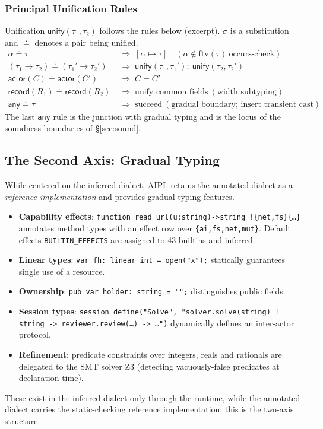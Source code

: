 \documentclass[11pt,a4paper]{article}
\newcommand{\code}[1]{\texttt{\small #1}}
\begin{document}
\subsubsection{Principal Unification Rules}
Unification $\mathsf{unify}(\tau_1,\tau_2)$ follows the rules below
(excerpt). $\sigma$ is a substitution and $\doteq$ denotes a pair being
unified.
\begin{align*}
\alpha \doteq \tau &\;\Rightarrow\; [\alpha \mapsto \tau]\quad
  (\alpha \notin \mathrm{ftv}(\tau)\ \text{occurs-check}) \\
(\tau_1 \to \tau_2) \doteq (\tau_1' \to \tau_2') &\;\Rightarrow\;
  \mathsf{unify}(\tau_1,\tau_1');\ \mathsf{unify}(\tau_2,\tau_2') \\
\mathsf{actor}(C) \doteq \mathsf{actor}(C') &\;\Rightarrow\;
  C = C' \\
\mathsf{record}(R_1) \doteq \mathsf{record}(R_2) &\;\Rightarrow\;
  \text{unify common fields}\ (\text{width subtyping}) \\
\mathsf{any} \doteq \tau &\;\Rightarrow\;
  \text{succeed}\ (\text{gradual boundary; insert transient cast})
\end{align*}
The last \code{any} rule is the junction with gradual typing and is the
locus of the soundness boundaries of \S\ref{sec:sound}.

\subsection{The Second Axis: Gradual Typing}\label{sec:gradual}
While centered on the inferred dialect, AIPL retains the annotated
dialect as a \emph{reference implementation} and provides gradual-typing
features.
\begin{itemize}[leftmargin=1.4em,itemsep=2pt]
  \item \textbf{Capability effects}:
        \code{function read\_url(u:string)->string !\{net,fs\}\{\dots\}}
        annotates method types with an effect row over
        \code{\{ai,fs,net,mut\}}. Default effects \code{BUILTIN\_EFFECTS}
        are assigned to 43 builtins and inferred.
  \item \textbf{Linear types}: \code{var fh: linear int = open("x");}
        statically guarantees single use of a resource.
  \item \textbf{Ownership}: \code{pub var holder: string = "";}
        distinguishes public fields.
  \item \textbf{Session types}:
        \code{session\_define("Solve", "solver.solve(string) ! string -> reviewer.review(\dots) -> \dots")}
        dynamically defines an inter-actor protocol.
  \item \textbf{Refinement}: predicate constraints over integers, reals
        and rationals are delegated to the SMT solver Z3 (detecting
        vacuously-false predicates at declaration time).
\end{itemize}
These exist in the inferred dialect only through the runtime, while the
annotated dialect carries the static-checking reference implementation;
this is the two-axis structure.
\end{document}
